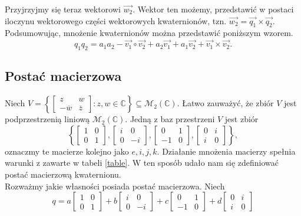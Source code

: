 \documentclass[a4paper,twoside,11pt,reqno]{mwrep}
\theoremstyle{plain} \newtheorem{twr}{Twierdzenie}
\theoremstyle{plain} \newtheorem{lem}{Lemat}
\theoremstyle{definition} \newtheorem{defi}{Definicja}
\theoremstyle{remark} \newtheorem*{wni}{Wniosek}
\theoremstyle{definition} \newtheorem{uwaga}{Uwaga}
\theoremstyle{definition}\newtheorem{prz}{Przykład}
\begin{document}
Przyjrzyjmy się teraz wektorowi $\overrightarrow{w_2}$. Wektor ten możemy, przedstawić
w postaci iloczynu wektorowego części wektorowych kwaternionów, tzn. 
$\overrightarrow{w_2} = \overrightarrow{q_1}\times\overrightarrow{q_2}$.\\
\indent
Podsumowując, mnożenie kwaternionów można przedstawić poniższym wzorem.
$$q_1q_2 =a_1a_2-\overrightarrow{v_1}\circ \overrightarrow{v_2}+a_2\overrightarrow{v_1}+a_1\overrightarrow{v_2}+\overrightarrow{v_1}\times \overrightarrow{v_2}.$$   
\subsection{Postać macierzowa}
Niech $V = \left\lbrace \begin{bmatrix}
	z&w\\
	-\overline{w}& \overline{z}
\end{bmatrix}: z,w \in \mathbb{C}\right\rbrace \subseteq
 \mathcal{M}_2\left(\mathbb{C}\right)$. 
Łatwo zauważyć, że zbiór $V$ jest podprzestrzenią liniową 
$\mathcal{M}_2\left(\mathbb{C}\right)$.
Jedną z baz przestrzeni $V$ jest zbiór 
$$\left\lbrace \begin{bmatrix}
	1&0\\
	0& 1
\end{bmatrix},
\begin{bmatrix}
	i&0\\
	0& -i
\end{bmatrix},
\begin{bmatrix}
	0&1\\
	-1& 0
\end{bmatrix},
\begin{bmatrix}
	0&i\\
	i& 0
\end{bmatrix}\right\rbrace,$$
oznaczmy te macierze kolejno jako $e,i,j,k$. Działanie mnożenia macierzy spełnia warunki z 
zawarte w tabeli \ref{table}. W ten sposób udało nam się zdefiniować postać macierzową
kwaternionu.\\
\indent
Rozważmy jakie własności posiada postać macierzowa. Niech
$$ q=a\begin{bmatrix}
	1&0\\
	0& 1
\end{bmatrix}+
b\begin{bmatrix}
	i&0\\
	0& -i
\end{bmatrix}+
c\begin{bmatrix}
	0&1\\
	-1& 0
\end{bmatrix}+
d\begin{bmatrix}
	0&i\\
	i& 0
\end{bmatrix}$$
\end{document}
